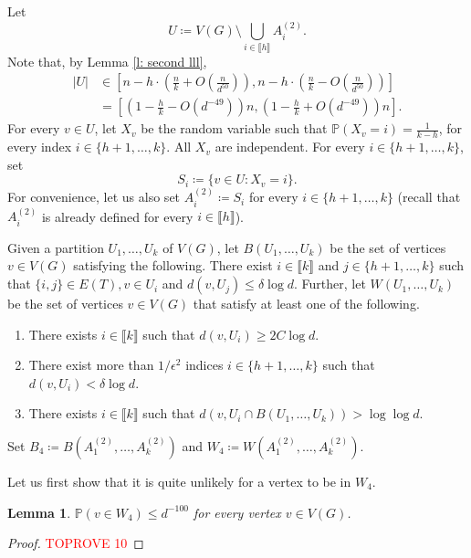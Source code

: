 \documentclass[notitlepage]{scrartcl}
\newcommand{\br}[1]{\llbracket{#1}\rrbracket}
\newtheorem{lemma}[thm]{Lemma}
\renewcommand{\Pr}{\mathbb{P}}
\begin{document}
Let 
\begin{equation}
    U\coloneqq V(G)\setminus \bigcup_{i \in \br{h}} A_i^{(2)}.
    \label{eq:U-def}
\end{equation}
    Note that, by Lemma \ref{l: second lll},
\begin{align}
  |U|&\in \left[n-h\cdot\left(\frac{n}{k}+O\left(\frac{n}{d^{50}}\right)\right), n-h\cdot\left(\frac{n}{k}-O\left(\frac{n}{d^{50}}\right)\right)\right]\nonumber\\
  &=\left[\left(1-\frac{h}{k}-O(d^{-49})\right)n, \left(1-\frac{h}{k}+O(d^{-49})\right)n\right]. \label{eq: size y}
\end{align}
For every $v \in U$, let $X_v$ be the random variable such that $\mathbb{P}\left(X_v=i\right)=\frac{1}{k-h}$, for every index $i\in\{h+1,\ldots,k\}$. All $X_v$ are independent. For every $i\in\{h+1,\ldots,k\}$, set 
\[
    S_i \coloneqq \{v \in U \colon X_v = i\}.
\]
For convenience, let us also set $A_i^{(2)}\coloneqq S_i$ for every $i\in \{h+1,\ldots,k\}$ (recall that $A_i^{(2)}$ is already defined for every $i\in \br{h}$).


Given a partition $U_1,\ldots, U_k$ of $V(G)$, let $B(U_1,\ldots, U_k)$ be the set of vertices $v\in V(G)$ satisfying the following. There exist $i\in \br{k}$ and $j\in \{h+1,\ldots, k\}$ such that $\{i,j\}\in E(T), v\in U_i$ and $d(v,U_j)\le \delta \log d$. Further, let $W(U_1,\ldots, U_k)$ be the set of vertices $v\in V(G)$ that satisfy at least one of the following.
\begin{enumerate}
    \item There exists $i \in \br{k}$ such that $d(v, U_i )\ge 2C \log d$.
    \item There exist more than $1 / \epsilon^2$ indices $i \in \{h+1,\ldots,k\}$ such that $d(v, U_i) < \delta \log d$.
    \item There exists $i \in \br{k}$ such that $d\left(v, U_i \cap B(U_1,\ldots,U_k)\right) > \log \log d$.    
\end{enumerate}
Set $B_4\coloneqq B(A_1^{(2)},\ldots, A_k^{(2)})$ and $W_4\coloneqq W(A_1^{(2)},\ldots, A_k^{(2)})$.

Let us first show that it is quite unlikely for a vertex to be in $W_4$.
\begin{lemma}\label{l: prob w0}
    $\Pr(v \in W_4) \le d^{-100}$ for every vertex $v \in V(G)$.
\end{lemma}
\begin{proof}\textcolor{red}{TOPROVE 10}\end{proof}
\end{document}
